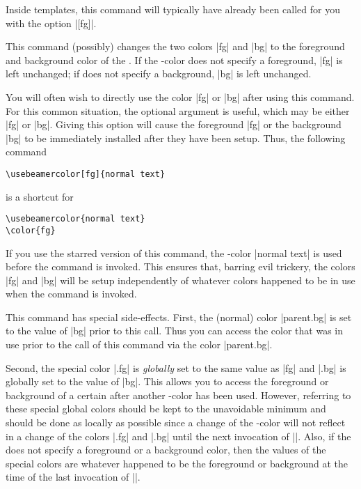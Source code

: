 Inside templates, this command will typically have already been called
for you with the option |[fg]|. 

\begin{command}{\usebeamercolor\opt{|*|}}
  This command (possibly) changes the two colors |fg| and |bg| to the
  foreground and background color of the . If
  the \beamer-color does not specify a foreground, |fg| is left
  unchanged; if does not specify a background, |bg| is left
  unchanged. 

  You will often wish to directly use the color |fg| or |bg| after
  using this command. For this common situation, the optional argument
   is useful, which may be either |fg| or
  |bg|. Giving this option will cause the foreground |fg| or the
  background |bg| to be immediately installed after they have been
  setup. Thus, the following command
\begin{verbatim}
\usebeamercolor[fg]{normal text}
\end{verbatim}
  is a shortcut for
\begin{verbatim}
\usebeamercolor{normal text}
\color{fg}
\end{verbatim}

  If you use the starred version of this command, the \beamer-color
  |normal text| is used before the command is invoked. This ensures
  that, barring evil trickery, the colors |fg| and |bg| will be setup
  independently of whatever colors happened to be in use when the
  command is invoked.

  This command has special side-effects. First, the (normal) color
  |parent.bg| is set to the value of |bg| prior to this call. Thus you
  can access the color that was in use prior to the call of this
  command via the color |parent.bg|.

  Second, the special color |.fg| is \emph{globally}
  set to the same value as |fg| and |.bg| is
  globally set to the value of |bg|. This allows you to access the
  foreground or background of a certain  after
  another \beamer-color has been used. However, referring to these
  special global colors should be kept to the unavoidable minimum and
  should be done as locally as possible since a change of the
  \beamer-color will not reflect in a change of the colors
  |.fg| and |.bg|
  until the next invocation of |\usebeamercolor|. Also, if the
   does not specify a foreground or a
  background color, then the values of the special colors are whatever
  happened to be the foreground or background at the time of the last
  invocation of |\usebeamercolor|.


\end{command}
